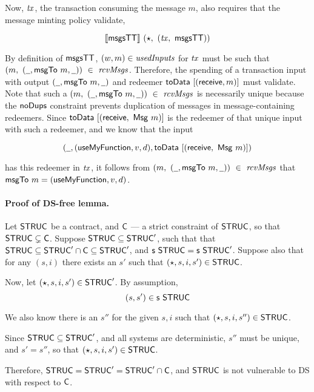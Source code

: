 Now, $\mathit{tx}$, the transaction consuming the message $m$, also requires that
the message minting policy validate,

\[\llbracket\mathsf{msgsTT}\rrbracket~(\star,~(\mathit{tx},~\mathsf{msgsTT}))\]

By definition of $\mathsf{msgsTT}$, $(w, m) \in \mathit{usedInputs}$ for $\mathit{tx}$ must be such that
$(m,~(\wcard, \fun{msgTo}~m, \wcard))~\in~\var{rcvMsgs}$. Therefore,
the spending of a transaction input with output $(\wcard, \fun{msgTo}~m, \wcard)$
and redeemer $\mathsf{toData}~[(\mathsf{receive}, m)]$ must validate.
Note that such a
$(m,~(\wcard, \fun{msgTo}~m, \wcard))~\in~\var{rcvMsgs}$ is necessarily
unique because the $\mathsf{noDups}$ constraint prevents duplication of messages in
message-containing redeemers. Since $\mathsf{toData}~[(\mathsf{receive},~\mathsf{Msg}~m)]$
is the redeemer of that unique input with such a redeemer, and we know that
the input

\[ (\wcard, (\mathsf{useMyFunction}, v, d), \fun{toData}~[(\receive,~\Msg~m)]) \]

has this redeemer in $\mathit{tx}$, it follows from $(m,~(\wcard, \fun{msgTo}~m, \wcard))~\in~\var{rcvMsgs}$
that
$\mathsf{msgTo}~m = (\mathsf{useMyFunction}, v, d)$.

%
%
%
%
%
%


\paragraph{Proof of DS-free lemma. }
\label{pf:dsfree}
Let $\mathsf{STRUC}$ be a contract, and $\mathsf{C}$ --- a strict constraint of
$\mathsf{STRUC}$, so that $\mathsf{STRUC} \subsetneq \mathsf{C}$.
Suppose $\mathsf{STRUC} \subseteq \mathsf{STRUC}'$, such that
that $\mathsf{STRUC} \subseteq \mathsf{STRUC}' \cap \mathsf{C} \subseteq \mathsf{STRUC}'$, and
$\mathsf{s}~\mathsf{STRUC} = \mathsf{s}~\mathsf{STRUC}'$.
Suppose also that for any $(s, i)$ there exists
an $s'$ such that $(\star, s, i, s') \in \mathsf{STRUC}$.

Now, let $(\star, s, i, s') \in \mathsf{STRUC}'$. By assumption,
\[ (s, s') \in \mathsf{s}~\mathsf{STRUC} \]

We also know there is an $s''$ for the
given $s, i$ such that $(\star, s, i, s'') \in \mathsf{STRUC}$.

Since $\mathsf{STRUC} \subseteq \mathsf{STRUC}'$, and all systems are deterministic, $s''$
must be unique, and $s' = s''$, so that $(\star, s, i, s') \in \mathsf{STRUC}$.

Therefore, $\mathsf{STRUC} = \mathsf{STRUC}' = \mathsf{STRUC}' \cap \mathsf{C}$, and $\mathsf{STRUC}$ is not vulnerable to DS
with respect to $\mathsf{C}$. \newline
